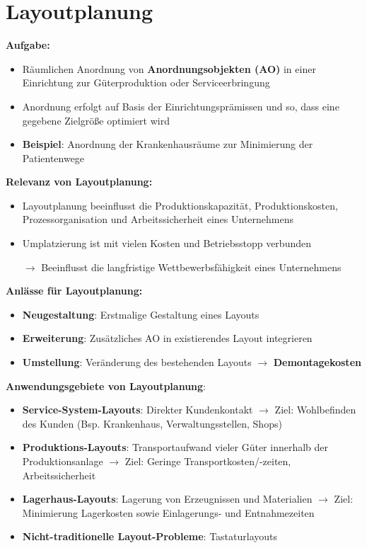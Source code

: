 \section{Layoutplanung}

\textbf{Aufgabe:} 
\begin{itemize}
	\item Räumlichen Anordnung von \textbf{Anordnungsobjekten (AO)} in einer Einrichtung zur Güterproduktion oder Serviceerbringung
	\item Anordnung erfolgt auf Basis der Einrichtungsprämissen und so, dass eine gegebene Zielgröße optimiert wird
	\item \textbf{Beispiel}: Anordnung der Krankenhausräume zur Minimierung der Patientenwege
\end{itemize} 
\pagebreak
\textbf{Relevanz von Layoutplanung:}
\begin{itemize}
	\item Layoutplanung beeinflusst die Produktionskapazität, Produktionskosten, Prozessorganisation und Arbeitssicherheit eines Unternehmens
	\item Umplatzierung ist mit vielen Kosten und Betriebsstopp verbunden 
	
	$\rightarrow$ Beeinflusst die langfristige Wettbewerbsfähigkeit eines Unternehmens
\end{itemize}
\bigskip
\textbf{Anlässe für Layoutplanung:}
\begin{itemize}
	\item \textbf{Neugestaltung}: Erstmalige Gestaltung eines Layouts
	\item \textbf{Erweiterung}: Zusätzliches AO in existierendes Layout integrieren
	\item \textbf{Umstellung}: Veränderung des bestehenden Layouts $\rightarrow$ \textbf{Demontagekosten}
\end{itemize}
\bigskip
\textbf{Anwendungsgebiete von Layoutplanung}:
\begin{itemize}
	\item \textbf{Service-System-Layouts}: Direkter Kundenkontakt $\rightarrow$ Ziel: Wohlbefinden des Kunden (Bsp. Krankenhaus, Verwaltungsstellen, Shops)
	\item \textbf{Produktions-Layouts}: Transportaufwand vieler Güter innerhalb der Produktionsanlage $\rightarrow$ Ziel: Geringe Transportkosten/-zeiten, Arbeitssicherheit
	\item \textbf{Lagerhaus-Layouts}: Lagerung von Erzeugnissen und Materialien $\rightarrow$ Ziel: Minimierung Lagerkosten sowie Einlagerungs- und Entnahmezeiten
	\item \textbf{Nicht-traditionelle Layout-Probleme}: Tastaturlayouts
\end{itemize}

